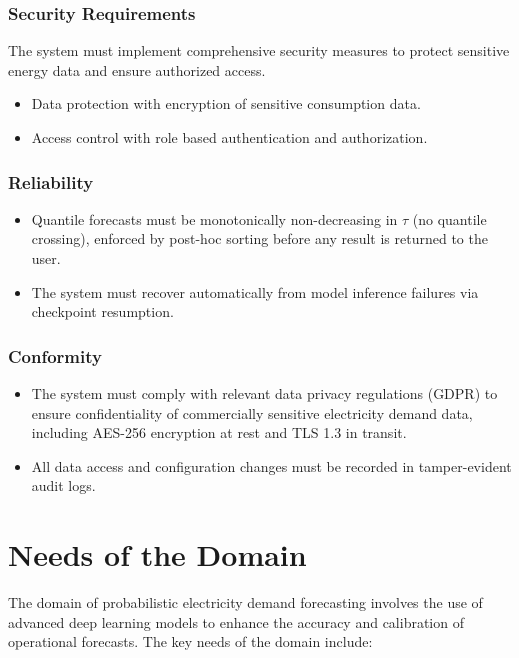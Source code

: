 \subsubsection{Security Requirements}
The system must implement comprehensive security measures to protect sensitive energy data and ensure authorized access.
\begin{itemize}
    \item Data protection with encryption of sensitive consumption data.
    \item Access control with role based authentication and authorization.
\end{itemize}

\subsubsection{Reliability}
\begin{itemize}
    \item Quantile forecasts must be monotonically non-decreasing in
          $\tau$ (no quantile crossing), enforced by post-hoc sorting
          before any result is returned to the user.
    \item The system must recover automatically from model inference
          failures via checkpoint resumption.
\end{itemize}

\subsubsection{Conformity}
\begin{itemize}
    \item The system must comply with relevant data privacy regulations
          (GDPR) to ensure confidentiality of commercially sensitive
          electricity demand data, including AES-256 encryption at rest
          and TLS 1.3 in transit.
    \item All data access and configuration changes must be recorded in
          tamper-evident audit logs.
\end{itemize}

\section{Needs of the Domain}
\label{sec:domain_needs}

The domain of probabilistic electricity demand forecasting involves the use
of advanced deep learning models to enhance the accuracy and calibration of
operational forecasts. The key needs of the domain include:

